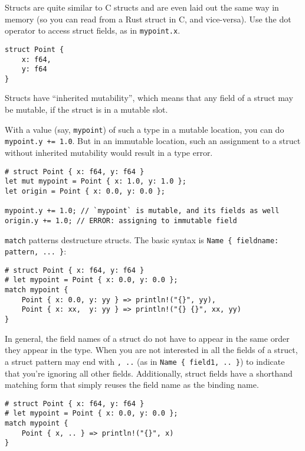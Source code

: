 \documentclass[]{article}
\begin{document}
Structs are quite similar to C structs and are even laid out the same
way in memory (so you can read from a Rust struct in C, and vice-versa).
Use the dot operator to access struct fields, as in \texttt{mypoint.x}.

\begin{verbatim}
struct Point {
    x: f64,
    y: f64
}
\end{verbatim}

Structs have ``inherited mutability'', which means that any field of a
struct may be mutable, if the struct is in a mutable slot.

With a value (say, \texttt{mypoint}) of such a type in a mutable
location, you can do \texttt{mypoint.y += 1.0}. But in an immutable
location, such an assignment to a struct without inherited mutability
would result in a type error.

\begin{verbatim}
# struct Point { x: f64, y: f64 }
let mut mypoint = Point { x: 1.0, y: 1.0 };
let origin = Point { x: 0.0, y: 0.0 };

mypoint.y += 1.0; // `mypoint` is mutable, and its fields as well
origin.y += 1.0; // ERROR: assigning to immutable field
\end{verbatim}

\texttt{match} patterns destructure structs. The basic syntax is
\texttt{Name \{ fieldname: pattern, ... \}}:

\begin{verbatim}
# struct Point { x: f64, y: f64 }
# let mypoint = Point { x: 0.0, y: 0.0 };
match mypoint {
    Point { x: 0.0, y: yy } => println!("{}", yy),
    Point { x: xx,  y: yy } => println!("{} {}", xx, yy)
}
\end{verbatim}

In general, the field names of a struct do not have to appear in the
same order they appear in the type. When you are not interested in all
the fields of a struct, a struct pattern may end with \texttt{, ..} (as
in \texttt{Name \{ field1, .. \}}) to indicate that you're ignoring all
other fields. Additionally, struct fields have a shorthand matching form
that simply reuses the field name as the binding name.

\begin{verbatim}
# struct Point { x: f64, y: f64 }
# let mypoint = Point { x: 0.0, y: 0.0 };
match mypoint {
    Point { x, .. } => println!("{}", x)
}
\end{verbatim}

\end{document}
